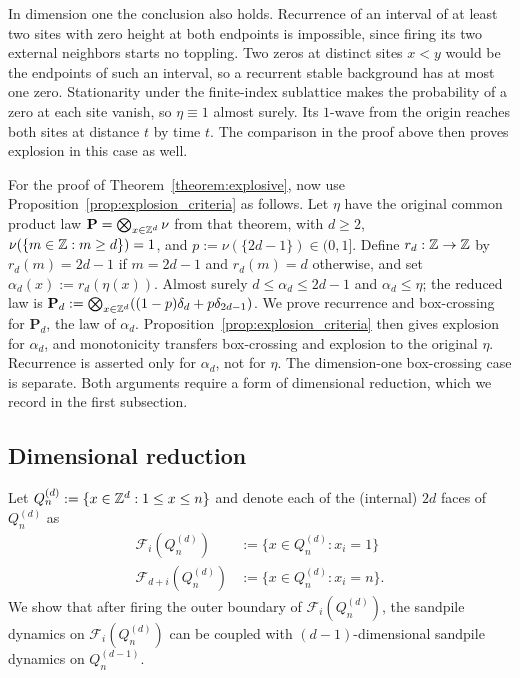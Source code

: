 \documentclass[12pt]{amsart}
\begin{document}
In dimension one the conclusion also holds. Recurrence of an interval of at least two sites with zero height at both endpoints is impossible, since firing its two external neighbors starts no toppling. Two zeros at distinct sites $x<y$ would be the endpoints of such an interval, so a recurrent stable background has at most one zero. Stationarity under the finite-index sublattice makes the probability of a zero at each site vanish, so $\eta\equiv1$ almost surely. Its $1$-wave from the origin reaches both sites at distance $t$ by time $t$. The comparison in the proof above then proves explosion in this case as well.

For the proof of Theorem~\ref{theorem:explosive}, now use Proposition~\ref{prop:explosion_criteria} as follows.
Let $\eta$ have the original common product law $\mathbf P=\bigotimes_{x\in\mathbb{Z}^d}\nu$ from that theorem, with $d\geq2$, $\nu(\{m\in\mathbb{Z}:m\geq d\})=1$, and $p:=\nu(\{2d-1\})\in(0,1]$.
Define $r_d:\mathbb{Z}\to\mathbb{Z}$ by $r_d(m)=2d-1$ if $m=2d-1$ and $r_d(m)=d$ otherwise, and set $\alpha_d(x):=r_d(\eta(x))$.
Almost surely $d\leq\alpha_d\leq2d-1$ and $\alpha_d\leq\eta$; the reduced law is $\mathbf P_d:=\bigotimes_{x\in\mathbb{Z}^d}((1-p)\delta_d+p\delta_{2d-1})$.
We prove recurrence and box-crossing for $\mathbf P_d$, the law of $\alpha_d$. Proposition~\ref{prop:explosion_criteria} then gives explosion for $\alpha_d$, and monotonicity transfers box-crossing and explosion to the original $\eta$. Recurrence is asserted only for $\alpha_d$, not for $\eta$. The dimension-one box-crossing case is separate. Both arguments require a form of dimensional reduction, which we record in the first subsection.



\subsection{Dimensional reduction}
Let $Q_n^{(d)} := \{ x \in \mathbb{Z}^d : 1 \leq x \leq n\}$ and denote each of the (internal) $2d$ faces of $Q_n^{(d)}$ as 
\begin{equation}\label{eq:faces_definition}
\begin{aligned}
\mathcal{F}_i(Q_n^{(d)}) &:= \{ x \in Q_n^{(d)} : x_i = 1\} \\
\mathcal{F}_{d+i}(Q_n^{(d)}) &:= \{ x \in Q_n^{(d)} : x_i = n\}.
\end{aligned}
\end{equation}
We show that after firing the outer boundary of $\mathcal{F}_i(Q_n^{(d)})$, 
the sandpile dynamics on $\mathcal{F}_i(Q_n^{(d)})$ can be coupled
with $(d-1)$-dimensional sandpile dynamics on $Q_n^{(d-1)}$.
\end{document}
